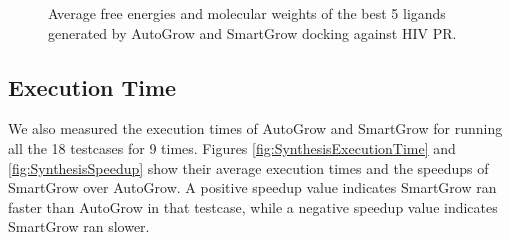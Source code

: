 \begin{figure}
{  \label{subfig:Best5-3KFN-ZINC09365179}
}
\caption{Average free energies and molecular weights of the best 5 ligands generated by AutoGrow and SmartGrow docking against HIV PR.}
\label{fig:Best5-3KFN}
\end{figure}

\subsection{Execution Time}

We also measured the execution times of AutoGrow and SmartGrow for running all the 18 testcases for 9 times. Figures \ref{fig:SynthesisExecutionTime} and \ref{fig:SynthesisSpeedup} show their average execution times and the speedups of SmartGrow over AutoGrow. A positive speedup value indicates SmartGrow ran faster than AutoGrow in that testcase, while a negative speedup value indicates SmartGrow ran slower.

